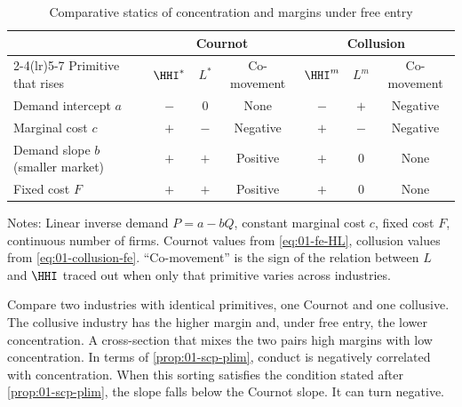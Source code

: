 \begin{table}[htbp]
\centering\small
\caption{Comparative statics of concentration and margins under free entry}
\label{tab:01-free-entry-cs}
\begin{threeparttable}
\begin{tabular}{lcccccc}
\toprule
 & \multicolumn{3}{c}{Cournot} & \multicolumn{3}{c}{Collusion} \\
\cmidrule(lr){2-4}\cmidrule(lr){5-7}
Primitive that rises & $\HHI^*$ & $L^*$ & Co-movement & $\HHI^m$ & $L^m$ & Co-movement \\
\midrule
Demand intercept $a$ & $-$ & $0$ & None & $-$ & $+$ & Negative \\
Marginal cost $c$ & $+$ & $-$ & Negative & $+$ & $-$ & Negative \\
Demand slope $b$ (smaller market) & $+$ & $+$ & Positive & $+$ & $0$ & None \\
Fixed cost $F$ & $+$ & $+$ & Positive & $+$ & $0$ & None \\
\bottomrule
\end{tabular}
\begin{tablenotes}\footnotesize
\item Notes: Linear inverse demand $P = a - bQ$, constant marginal cost $c$, fixed cost $F$, continuous
number of firms. Cournot values from \eqref{eq:01-fe-HL}, collusion values from \eqref{eq:01-collusion-fe}.
``Co-movement'' is the sign of the relation between $L$ and $\HHI$ traced out when only that primitive
varies across industries.
\end{tablenotes}
\end{threeparttable}
\end{table}

Compare two industries with identical primitives, one Cournot and one
collusive. The collusive industry has the higher margin and, under free entry, the lower concentration.
A cross-section that mixes the two
pairs high margins with low concentration. In terms of \cref{prop:01-scp-plim}, conduct is negatively
correlated with concentration. When this sorting satisfies the condition stated after
\cref{prop:01-scp-plim}, the slope falls below the Cournot slope. It can turn negative.

